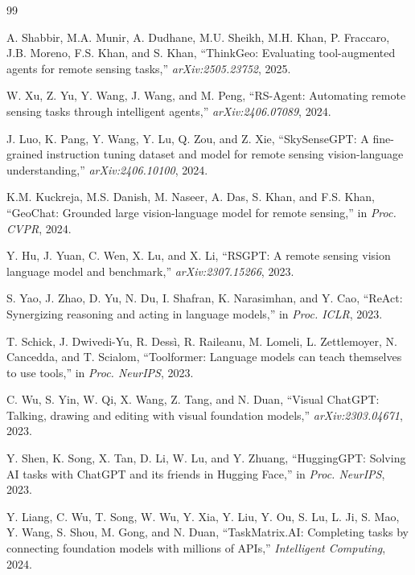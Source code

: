 \documentclass[journal]{IEEEtran}
\begin{document}

% 

\begin{thebibliography}{99}

A. Shabbir, M.A. Munir, A. Dudhane, M.U. Sheikh, M.H. Khan, P. Fraccaro, J.B. Moreno, F.S. Khan, and S. Khan, ``ThinkGeo: Evaluating tool-augmented agents for remote sensing tasks,'' \textit{arXiv:2505.23752}, 2025.

W. Xu, Z. Yu, Y. Wang, J. Wang, and M. Peng, ``RS-Agent: Automating remote sensing tasks through intelligent agents,'' \textit{arXiv:2406.07089}, 2024.

J. Luo, K. Pang, Y. Wang, Y. Lu, Q. Zou, and Z. Xie, ``SkySenseGPT: A fine-grained instruction tuning dataset and model for remote sensing vision-language understanding,'' \textit{arXiv:2406.10100}, 2024.

K.M. Kuckreja, M.S. Danish, M. Naseer, A. Das, S. Khan, and F.S. Khan, ``GeoChat: Grounded large vision-language model for remote sensing,'' in \textit{Proc. CVPR}, 2024.

Y. Hu, J. Yuan, C. Wen, X. Lu, and X. Li, ``RSGPT: A remote sensing vision language model and benchmark,'' \textit{arXiv:2307.15266}, 2023.

S. Yao, J. Zhao, D. Yu, N. Du, I. Shafran, K. Narasimhan, and Y. Cao, ``ReAct: Synergizing reasoning and acting in language models,'' in \textit{Proc. ICLR}, 2023.

T. Schick, J. Dwivedi-Yu, R. Dess\`i, R. Raileanu, M. Lomeli, L. Zettlemoyer, N. Cancedda, and T. Scialom, ``Toolformer: Language models can teach themselves to use tools,'' in \textit{Proc. NeurIPS}, 2023.

C. Wu, S. Yin, W. Qi, X. Wang, Z. Tang, and N. Duan, ``Visual ChatGPT: Talking, drawing and editing with visual foundation models,'' \textit{arXiv:2303.04671}, 2023.

Y. Shen, K. Song, X. Tan, D. Li, W. Lu, and Y. Zhuang, ``HuggingGPT: Solving AI tasks with ChatGPT and its friends in Hugging Face,'' in \textit{Proc. NeurIPS}, 2023.

Y. Liang, C. Wu, T. Song, W. Wu, Y. Xia, Y. Liu, Y. Ou, S. Lu, L. Ji, S. Mao, Y. Wang, S. Shou, M. Gong, and N. Duan, ``TaskMatrix.AI: Completing tasks by connecting foundation models with millions of APIs,'' \textit{Intelligent Computing}, 2024.


\end{thebibliography}
\end{document}
